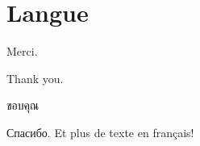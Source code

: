 \documentclass{article}
\begin{document}
\section{Langue}
 
Merci. 

\foreignlanguage{english}{Thank you.}

\foreignlanguage{thai}{ขอบคุณ} 

\foreignlanguage{russian}{Спасибо.} Et plus de
texte en français!

 
\end{document}
